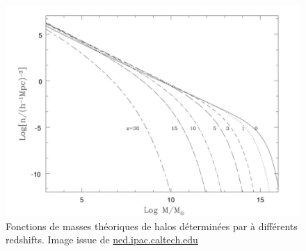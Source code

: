 \begin{figure}
        \includegraphics[width=.95\linewidth]{img/01/press.jpg} 
        \caption[HMF théorique]{Fonctions de masses théoriques de halos déterminées par \cite{1974ApJ...187..425P} à différents redshifts.
        Image issue de \href{ned.ipac.caltech.edu}{ned.ipac.caltech.edu}
 		\label{fig:hmfpress}}
\end{figure}
